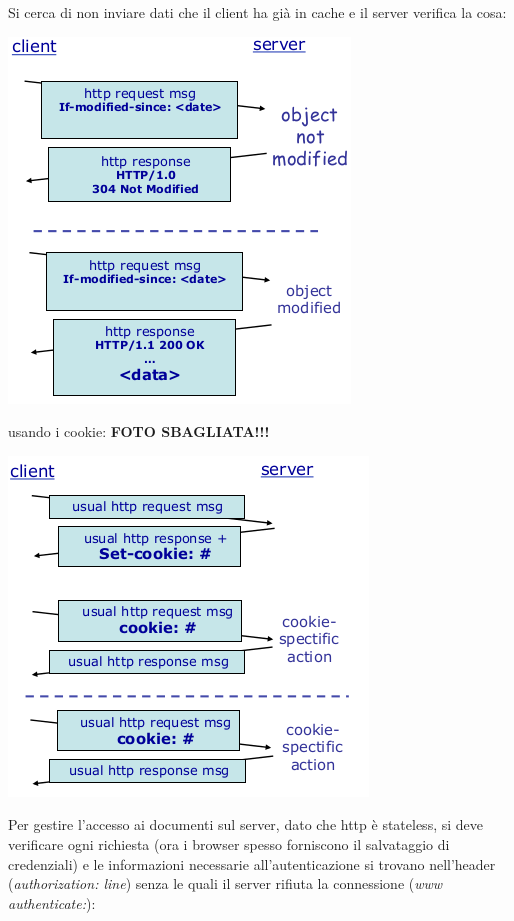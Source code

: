 \documentclass[a4paper,12pt, oneside]{book}
\begin{document}
Si cerca di non inviare dati che il client ha già in cache e il server verifica la cosa:
\begin{center}
	\includegraphics[scale=0.7]{img/http4.png}
\end{center}
usando i cookie:
\textbf{FOTO SBAGLIATA!!!}
\begin{center}
	\includegraphics[scale=0.7]{img/http5.png}
\end{center}
Per gestire l'accesso ai documenti sul server, dato che http è stateless, si deve verificare ogni richiesta (ora i browser spesso forniscono il salvataggio di credenziali) e le informazioni necessarie all'autenticazione si trovano nell'header (\textit{authorization: line}) senza le quali il server rifiuta la connessione (\textit{www authenticate:}):
\end{document}
